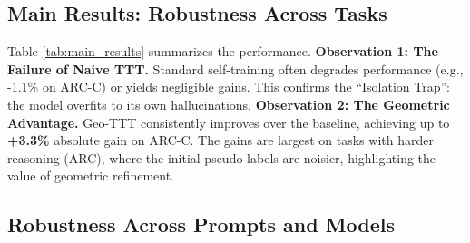 \documentclass{article}
\theoremstyle{plain}
\theoremstyle{definition}
\theoremstyle{remark}
\begin{document}
\subsection{Main Results: Robustness Across Tasks}

Table \ref{tab:main_results} summarizes the performance. 
\textbf{Observation 1: The Failure of Naive TTT.} Standard self-training often degrades performance (e.g., -1.1\% on ARC-C) or yields negligible gains. This confirms the ``Isolation Trap'': the model overfits to its own hallucinations.
\textbf{Observation 2: The Geometric Advantage.} Geo-TTT consistently improves over the baseline, achieving up to \textbf{+3.3\%} absolute gain on ARC-C. The gains are largest on tasks with harder reasoning (ARC), where the initial pseudo-labels are noisier, highlighting the value of geometric refinement.

\begin{table}[t]
\caption{Test Accuracy (\%) using Llama-3-8B. Geo-TTT consistently outperforms baselines, transforming negative adaptation (Naive TTT) into positive gains. Results averaged over 3 seeds.}
\label{tab:main_results}
\vskip 0.15in
\begin{center}
\begin{small}
\begin{sc}
\end{sc}
\end{small}
\end{center}
\vskip -0.1in
\end{table}

\subsection{Robustness Across Prompts and Models}
\label{sec:robustness}
\end{document}

